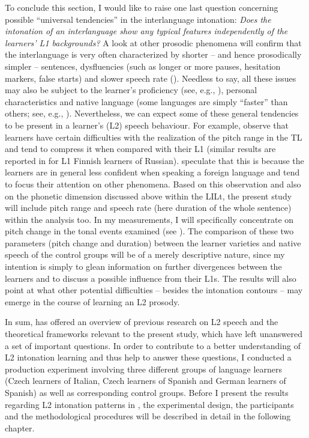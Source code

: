 To conclude this section, I would like to raise one last question concerning possible “universal tendencies” in the interlanguage intonation: \textit{Does the intonation of an interlanguage show any typical features independently of the learners’ L1 backgrounds?} A look at other prosodic phenomena will confirm that the interlanguage is very often characterized by shorter -- and hence prosodically simpler -- sentences, dysfluencies (such as longer or more pauses, hesitation markers, false starts) and slower speech rate (\citealt{DerwingMunro1997,DerwingMunro2015}). Needless to say, all these issues may also be subject to the learner’s proficiency (see, e.g., \citealt{GabrielEtAl2018}), personal characteristics and native language (some languages are simply “faster” than others; see, e.g., \citealt{Fenk-OczlonFenk2010}). Nevertheless, we can expect some of these general tendencies to be present in a learner’s (L2) speech behaviour. For example, \citet{ZimmererEtAl2014} observe that learners have certain difficulties with the realization of the pitch range in the TL and tend to compress it when compared with their L1 (similar results are reported in \citealt{Ullakonoja2007} for L1 Finnish learners of Russian). \citet[1037]{ZimmererEtAl2014} speculate that this is because the learners are in general less confident when speaking a foreign language and tend to focus their attention on other phenomena. Based on this observation and also on the phonetic dimension discussed above within the LILt, the present study will include pitch range and speech rate (here duration of the whole sentence) within the analysis too. In my measurements, I will specifically concentrate on pitch change in the tonal events examined (see ). The comparison of these two parameters (pitch change and duration) between the learner varieties and native speech of the control groups will be of a merely descriptive nature, since my intention is simply to glean information on further divergences between the learners and to discuss a possible influence from their L1s. The results will also point at what other potential difficulties -- besides the intonation contours -- may emerge in the course of learning an L2 prosody.



In sum,  has offered an overview of previous research on L2 speech and the theoretical frameworks relevant to the present study, which have left unanswered a set of important questions. In order to contribute to a better understanding of L2 intonation learning and thus help to answer these questions, I conducted a production experiment involving three different groups of language learners (Czech learners of Italian, Czech learners of Spanish and German learners of Spanish) as well as corresponding control groups. Before I present the results regarding L2 intonation patterns in , the experimental design, the participants and the methodological procedures will be described in detail in the following chapter.
